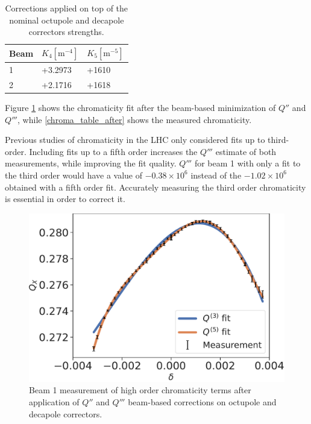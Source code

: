 \begin{table}[!htb]
    \centering
    \begin{tabular}{lll}
    \toprule
      Beam  &    $K_4 [\mathrm{m}^{-4}]$      &  $K_5 [\mathrm{m}^{-5}]$  \\
    \midrule
        1   &  +3.2973     &  +1610   \\
        2   &   +2.1716    &  +1618   \\
    \bottomrule
    \end{tabular}
    \caption{Corrections applied on top of the nominal octupole and decapole correctors strengths.}
    \label{mcdo_values_corr}
  \end{table}

Figure \ref{chroma_after_correction} shows the chromaticity fit after the beam-based minimization of $Q''$ and $Q'''$,
while \cref{chroma_table_after} shows the measured chromaticity.

Previous studies of chromaticity in the LHC only considered fits up to third-order.
Including fits up to a fifth order increases the $Q'''$ estimate of both measurements, while improving the fit quality. $Q'''$ for beam 1 with only a fit to the third order would have a value of $-0.38 \times 10^6$
instead of the $-1.02 \times 10^6$ obtained with a fifth order fit. 
Accurately measuring the third order chromaticity is essential in order to correct it.

\begin{figure}[tbh]
    \centering
    \includegraphics[width=1\columnwidth]{images/MOPL027_f3-1.pdf}
    \caption{Beam 1 measurement of high order chromaticity terms after application of $Q''$ and $Q'''$ 
             beam-based corrections on octupole and decapole correctors.}
    \label{chroma_after_correction}
\end{figure}


